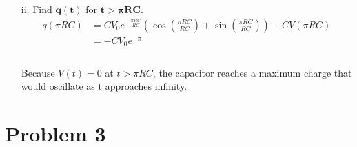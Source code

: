 \documentclass[]{article}
\begin{document}
{\begin{enumerate}
\begin{enumerate}
\begin{equation*}
								\begin{split}
									q(t) &= e^{-kt} ( CV_0 \cos kt + CV_0 \sin kt ) + CV(t) \\
									&= CV_0 e^{-\tfrac{t}{RC}} \left(\cos \left( \frac{t}{RC} \right) + \sin \left(\frac{t}{RC}\right)\right)  + CV(t) \\
									I(t) = q'(t) &= ke^{-kt}((CV_0 - CV_0) \cos kt - (CV_0 + CV_0) \sin kt) \\
									&= ke^{-kt}(-2CV_0 \sin kt) \\
									&= -\frac{2V_0}{R} e^{-\frac{t}{RC}} \sin \frac{t}{RC}
								\end{split}
							\end{equation*}
						\item[ii.] Find $\bm{q(t)}$ for $\bm{t > \pi RC}$.
						\begin{equation*}
							\begin{split}
								q(\pi RC) &= CV_0 e^{-\tfrac{\pi RC}{RC}} \left(\cos \left( \frac{\pi RC}{RC} \right) + \sin \left(\frac{\pi RC}{RC}\right)\right)  + CV(\pi RC) \\
								&= -CV_0 e^{-\pi} \\
							\end{split}
						\end{equation*}
						\paragraph{} Because $V(t) = 0$ at $t > \pi RC$, the capacitor reaches a maximum charge that would oscillate as t approaches infinity.
					\end{enumerate}
			\end{enumerate}
	\clearpage
	\section*{Problem 3}
}
\end{document}
